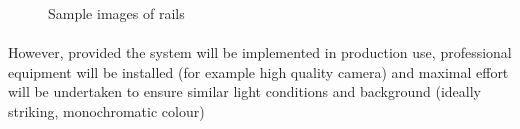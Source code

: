\begin{figure}[H]
     \centering
     \qquad
     \qquad
     \vfill
     \qquad
     \caption{Sample images of rails}
     \label{fig:different_lightning_conditions}
\end{figure}
 
\paragraph{}
However, provided the system will be implemented in production use, professional equipment will be installed (for example high quality camera) and maximal effort will be undertaken to ensure similar light conditions and background (ideally striking, monochromatic colour)

